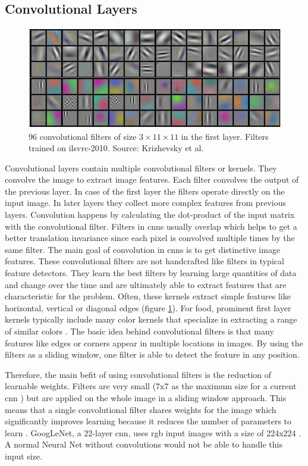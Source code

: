 \subsection*{Convolutional Layers}
\begin{figure}[ht]
	\centering
	\includegraphics[scale=0.45]{figures/theoryCNN_filter}
	\caption{96 convolutional filters of size $3\times 11\times 11$ in the first layer. Filters trained on \gls{ilsvrc}-2010. Source: Krizhevsky et al. \cite{Krizhevsky2012}}
	\label{fig:cnnFilter}
\end{figure}
Convolutional layers contain multiple convolutional filters or kernels. They convolve the image to extract image features. Each filter convolves the output of the previous layer. In case of the first layer the filters operate directly on the input image. In later layers they collect more complex features from previous layers. Convolution happens by calculating the dot-product of the input matrix with the convolutional filter. Filters in \glspl{cnn} usually overlap which helps to get a better translation invariance since each pixel is convolved multiple times by the same filter. The main goal of convolution in \glspl{cnn} is to get distinctive image features. These convolutional filters are not handcrafted like filters in typical feature detectors. They learn the best filters by learning large quantities of data and change over the time and are ultimately able to extract features that are characteristic for the problem. Often, these kernels extract simple features like horizontal, vertical or diagonal edges {(figure \ref{fig:cnnFilter})}. For food, prominent first layer kernels typically include many color kernels that specialize in extracting a range of similar colors \cite{Christodoulidis2015}. The basic idea behind convolutional filters is that many features like edges or corners appear in multiple locations in images. By using the filters as a sliding window, one filter is able to detect the feature in any position.  

Therefore, the main befit of using convolutional filters is the reduction of learnable weights. Filters are very small {(7x7 as the maximum size for a current \gls{cnn} \cite{Szegedy2014})} but are applied on the whole image in a sliding window approach. This means that a single convolutional filter shares weights for the image which significantly improves learning because it reduces the number of parameters to learn \cite{LeCun1998}. GoogLeNet, a 22-layer \gls{cnn}, uses \gls{rgb} input images with a size of 224x224 \cite{Szegedy2014}. A normal Neural Net without convolutions would not be able to handle this input size.

